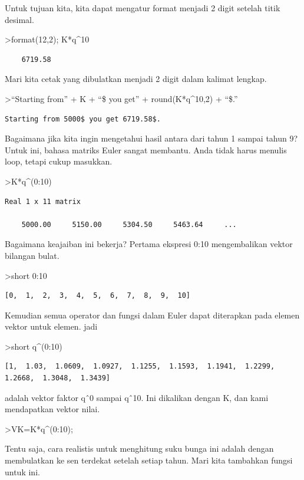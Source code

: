 \documentclass[
]{book}
\begin{document}
Untuk tujuan kita, kita dapat mengatur format menjadi 2 digit setelah titik desimal.

\textgreater format(12,2); K*q\^{}10

\begin{verbatim}
    6719.58 
\end{verbatim}

Mari kita cetak yang dibulatkan menjadi 2 digit dalam kalimat lengkap.

\textgreater{}``Starting from'' + K + ``\$ you get'' + round(K*q\^{}10,2) + ``\$.''

\begin{verbatim}
Starting from 5000$ you get 6719.58$.
\end{verbatim}

Bagaimana jika kita ingin mengetahui hasil antara dari tahun 1 sampai tahun 9? Untuk ini, bahasa matriks Euler sangat membantu. Anda tidak harus menulis loop, tetapi cukup masukkan.

\textgreater K*q\^{}(0:10)

\begin{verbatim}
Real 1 x 11 matrix

    5000.00     5150.00     5304.50     5463.64     ...
\end{verbatim}

Bagaimana keajaiban ini bekerja? Pertama ekspresi 0:10 mengembalikan vektor bilangan bulat.

\textgreater short 0:10

\begin{verbatim}
[0,  1,  2,  3,  4,  5,  6,  7,  8,  9,  10]
\end{verbatim}

Kemudian semua operator dan fungsi dalam Euler dapat diterapkan pada elemen vektor untuk elemen. jadi

\textgreater short q\^{}(0:10)

\begin{verbatim}
[1,  1.03,  1.0609,  1.0927,  1.1255,  1.1593,  1.1941,  1.2299,
1.2668,  1.3048,  1.3439]
\end{verbatim}

adalah vektor faktor qˆ0 sampai qˆ10. Ini dikalikan dengan K, dan kami mendapatkan vektor nilai.

\textgreater VK=K*q\^{}(0:10);

Tentu saja, cara realistis untuk menghitung suku bunga ini adalah dengan membulatkan ke sen terdekat setelah setiap tahun. Mari kita tambahkan fungsi untuk ini.
\end{document}

